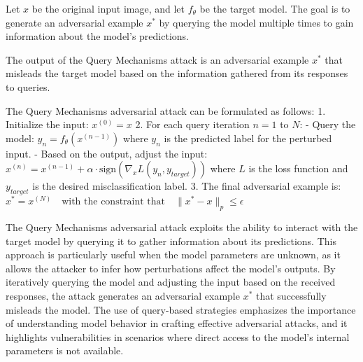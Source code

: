 Let $x$ be the original input image, and let $f_{\theta}$ be the target model. The goal is to generate an adversarial example $x^*$ by querying the model multiple times to gain information about the model's predictions.

The output of the Query Mechanisms attack is an adversarial example $x^*$ that misleads the target model based on the information gathered from its responses to queries.

The Query Mechanisms adversarial attack can be formulated as follows:
1. Initialize the input:
   $x^{(0)} = x$
2. For each query iteration $n = 1$ to $N$:
   - Query the model:
   $y_n = f_{\theta}(x^{(n-1)})$
   where $y_n$ is the predicted label for the perturbed input.
   - Based on the output, adjust the input:
   $x^{(n)} = x^{(n-1)} + \alpha \cdot \text{sign}(\nabla_x L(y_n, y_{target}))$
   where $L$ is the loss function and $y_{target}$ is the desired misclassification label.
3. The final adversarial example is:
   $x^* = x^{(N)} \quad \text{with the constraint that} \quad \|x^* - x\|_p \leq \epsilon$

The Query Mechanisms adversarial attack exploits the ability to interact with the target model by querying it to gather information about its predictions. This approach is particularly useful when the model parameters are unknown, as it allows the attacker to infer how perturbations affect the model's outputs. By iteratively querying the model and adjusting the input based on the received responses, the attack generates an adversarial example $x^*$ that successfully misleads the model. The use of query-based strategies emphasizes the importance of understanding model behavior in crafting effective adversarial attacks, and it highlights vulnerabilities in scenarios where direct access to the model's internal parameters is not available.
